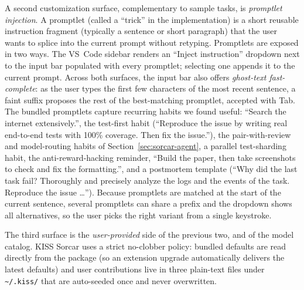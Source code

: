 \documentclass{article}
\begin{document}
A second customization surface, complementary to sample tasks, is \emph{promptlet injection}.  A promptlet (called a ``trick'' in the implementation) is a short reusable instruction fragment (typically a sentence or short paragraph) that the user wants to splice into the current prompt without retyping.  Promptlets are exposed in two ways.  The VS~Code sidebar renders an ``Inject instruction'' dropdown next to the input bar populated with every promptlet; selecting one appends it to the current prompt.  Across both surfaces, the input bar also offers \emph{ghost-text fast-complete}: as the user types the first few characters of the most recent sentence, a faint suffix proposes the rest of the best-matching promptlet, accepted with Tab.  The bundled promptlets capture recurring habits we found useful: ``Search the internet extensively.'', the test-first habit (``Reproduce the issue by writing real end-to-end tests with 100\% coverage.  Then fix the issue.''), the pair-with-review and model-routing habits of Section~\ref{sec:sorcar-agent}, a parallel test-sharding habit, the anti-reward-hacking reminder, ``Build the paper, then take screenshots to check and fix the formatting.'', and a postmortem template (``Why did the last task fail?  Thoroughly and precisely analyze the logs and the events of the task.  Reproduce the issue \ldots'').  Because promptlets are matched at the start of the current sentence, several promptlets can share a prefix and the dropdown shows all alternatives, so the user picks the right variant from a single keystroke.

The third surface is the \emph{user-provided} side of the previous two, and of the model catalog.  KISS Sorcar uses a strict no-clobber policy: bundled defaults are read directly from the package (so an extension upgrade automatically delivers the latest defaults) and user contributions live in three plain-text files under \texttt{\textasciitilde/.kiss/} that are auto-seeded once and never overwritten.
\end{document}
